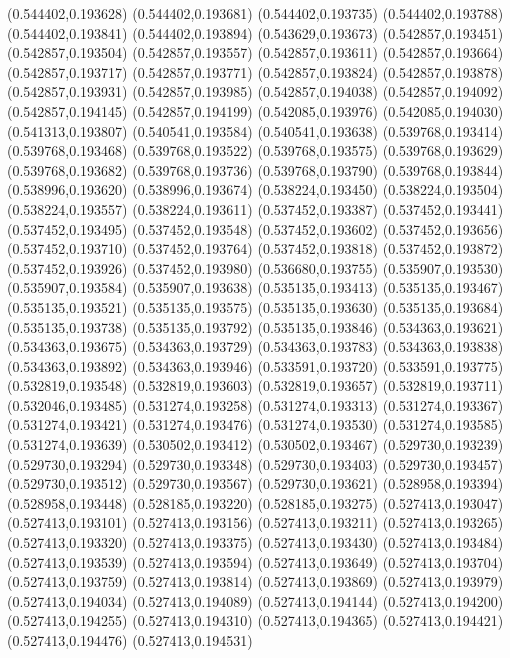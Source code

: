 (0.544402,0.193628)
(0.544402,0.193681)
(0.544402,0.193735)
(0.544402,0.193788)
(0.544402,0.193841)
(0.544402,0.193894)
(0.543629,0.193673)
(0.542857,0.193451)
(0.542857,0.193504)
(0.542857,0.193557)
(0.542857,0.193611)
(0.542857,0.193664)
(0.542857,0.193717)
(0.542857,0.193771)
(0.542857,0.193824)
(0.542857,0.193878)
(0.542857,0.193931)
(0.542857,0.193985)
(0.542857,0.194038)
(0.542857,0.194092)
(0.542857,0.194145)
(0.542857,0.194199)
(0.542085,0.193976)
(0.542085,0.194030)
(0.541313,0.193807)
(0.540541,0.193584)
(0.540541,0.193638)
(0.539768,0.193414)
(0.539768,0.193468)
(0.539768,0.193522)
(0.539768,0.193575)
(0.539768,0.193629)
(0.539768,0.193682)
(0.539768,0.193736)
(0.539768,0.193790)
(0.539768,0.193844)
(0.538996,0.193620)
(0.538996,0.193674)
(0.538224,0.193450)
(0.538224,0.193504)
(0.538224,0.193557)
(0.538224,0.193611)
(0.537452,0.193387)
(0.537452,0.193441)
(0.537452,0.193495)
(0.537452,0.193548)
(0.537452,0.193602)
(0.537452,0.193656)
(0.537452,0.193710)
(0.537452,0.193764)
(0.537452,0.193818)
(0.537452,0.193872)
(0.537452,0.193926)
(0.537452,0.193980)
(0.536680,0.193755)
(0.535907,0.193530)
(0.535907,0.193584)
(0.535907,0.193638)
(0.535135,0.193413)
(0.535135,0.193467)
(0.535135,0.193521)
(0.535135,0.193575)
(0.535135,0.193630)
(0.535135,0.193684)
(0.535135,0.193738)
(0.535135,0.193792)
(0.535135,0.193846)
(0.534363,0.193621)
(0.534363,0.193675)
(0.534363,0.193729)
(0.534363,0.193783)
(0.534363,0.193838)
(0.534363,0.193892)
(0.534363,0.193946)
(0.533591,0.193720)
(0.533591,0.193775)
(0.532819,0.193548)
(0.532819,0.193603)
(0.532819,0.193657)
(0.532819,0.193711)
(0.532046,0.193485)
(0.531274,0.193258)
(0.531274,0.193313)
(0.531274,0.193367)
(0.531274,0.193421)
(0.531274,0.193476)
(0.531274,0.193530)
(0.531274,0.193585)
(0.531274,0.193639)
(0.530502,0.193412)
(0.530502,0.193467)
(0.529730,0.193239)
(0.529730,0.193294)
(0.529730,0.193348)
(0.529730,0.193403)
(0.529730,0.193457)
(0.529730,0.193512)
(0.529730,0.193567)
(0.529730,0.193621)
(0.528958,0.193394)
(0.528958,0.193448)
(0.528185,0.193220)
(0.528185,0.193275)
(0.527413,0.193047)
(0.527413,0.193101)
(0.527413,0.193156)
(0.527413,0.193211)
(0.527413,0.193265)
(0.527413,0.193320)
(0.527413,0.193375)
(0.527413,0.193430)
(0.527413,0.193484)
(0.527413,0.193539)
(0.527413,0.193594)
(0.527413,0.193649)
(0.527413,0.193704)
(0.527413,0.193759)
(0.527413,0.193814)
(0.527413,0.193869)
(0.527413,0.193979)
(0.527413,0.194034)
(0.527413,0.194089)
(0.527413,0.194144)
(0.527413,0.194200)
(0.527413,0.194255)
(0.527413,0.194310)
(0.527413,0.194365)
(0.527413,0.194421)
(0.527413,0.194476)
(0.527413,0.194531)
